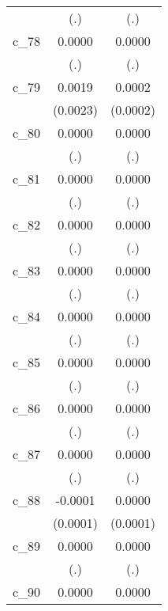 {\begin{tabular}{l*{2}{c}}
            &         (.)        &         (.)        \\
[1em]
c\_78        &      0.0000        &      0.0000        \\
            &         (.)        &         (.)        \\
[1em]
c\_79        &      0.0019        &      0.0002        \\
            &    (0.0023)        &    (0.0002)        \\
[1em]
c\_80        &      0.0000        &      0.0000        \\
            &         (.)        &         (.)        \\
[1em]
c\_81        &      0.0000        &      0.0000        \\
            &         (.)        &         (.)        \\
[1em]
c\_82        &      0.0000        &      0.0000        \\
            &         (.)        &         (.)        \\
[1em]
c\_83        &      0.0000        &      0.0000        \\
            &         (.)        &         (.)        \\
[1em]
c\_84        &      0.0000        &      0.0000        \\
            &         (.)        &         (.)        \\
[1em]
c\_85        &      0.0000        &      0.0000        \\
            &         (.)        &         (.)        \\
[1em]
c\_86        &      0.0000        &      0.0000        \\
            &         (.)        &         (.)        \\
[1em]
c\_87        &      0.0000        &      0.0000        \\
            &         (.)        &         (.)        \\
[1em]
c\_88        &     -0.0001        &      0.0000        \\
            &    (0.0001)        &    (0.0001)        \\
[1em]
c\_89        &      0.0000        &      0.0000        \\
            &         (.)        &         (.)        \\
[1em]
c\_90        &      0.0000        &      0.0000        \\

\end{tabular}}
